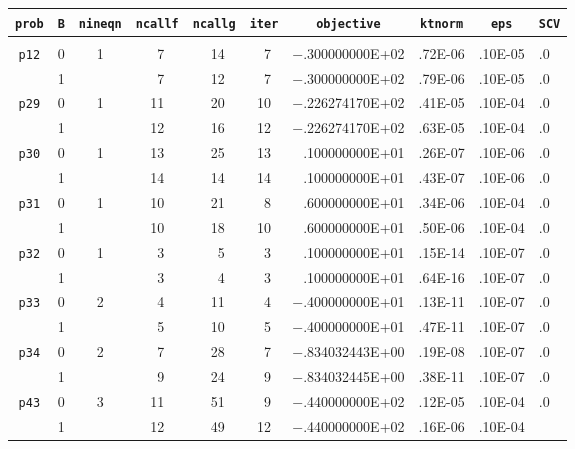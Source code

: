 \newpage
\renewcommand{\baselinestretch}{0.95} %
 \footnotesize{
\begin{tabular}{ccccccrlll} \hline
\multicolumn{1}{c}{{\tt prob}} & 
\multicolumn{1}{c}{{\tt B}} & 
\multicolumn{1}{c}{{\tt nineqn}} & 
\multicolumn{1}{c}{{\tt ncallf}} & 
\multicolumn{1}{c}{{\tt ncallg}} & 
\multicolumn{1}{c}{{\tt iter}} &
\multicolumn{1}{c}{{\tt objective}} & 
\multicolumn{1}{c}{{\tt ktnorm}} & 
\multicolumn{1}{c}{{\tt eps}} & 
\multicolumn{1}{l}{{\tt SCV}} \\ \hline \\

 {\tt p12} & 0 & 1  & ~7   &  ~14  &~7  &$-$.300000000E+02 &.72E-06 & .10E-05 &
.0\\
           & 1 &    & ~7   &  ~12  &~7  &$-$.300000000E+02 &.79E-06 & .10E-05 &
.0\\\hline
 {\tt p29} & 0 & 1  &  11  &  ~20  & 10 &$-$.226274170E+02 &.41E-05 & .10E-04 &
.0\\
           & 1 &    &  12  &  ~16  & 12 &$-$.226274170E+02 &.63E-05 & .10E-04 &
.0\\\hline
 {\tt p30} & 0 & 1  &  13  &  ~25  & 13 &   .100000000E+01 &.26E-07 & .10E-06 &
.0\\
           & 1 &    &  14  &  ~14  & 14 &   .100000000E+01 &.43E-07 & .10E-06 &
.0\\\hline
 {\tt p31} & 0 & 1  &  10  &  ~21  &~8  &   .600000000E+01 &.34E-06 & .10E-04 &
.0\\
           & 1 &    &  10  &  ~18  & 10 &   .600000000E+01 &.50E-06 & .10E-04 &
.0\\\hline
 {\tt p32} & 0 & 1  & ~3   & ~~5   &~3  &   .100000000E+01 &.15E-14 & .10E-07 &
.0\\
           & 1 &    & ~3   & ~~4   &~3  &   .100000000E+01 &.64E-16 & .10E-07 &
.0\\\hline
 {\tt p33} & 0 & 2  & ~4   &  ~11  &~4  &$-$.400000000E+01 &.13E-11 & .10E-07 &
.0\\
           & 1 &    & ~5   &  ~10  &~5  &$-$.400000000E+01 &.47E-11 & .10E-07 &
.0\\\hline
 {\tt p34} & 0 & 2  & ~7   &  ~28  &~7  &$-$.834032443E+00 &.19E-08 & .10E-07 &
.0\\
           & 1 &    & ~9   &  ~24  &~9  &$-$.834032445E+00 &.38E-11 & .10E-07 &
.0\\\hline
 {\tt p43} & 0 & 3  &  11  &  ~51  & ~9 &$-$.440000000E+02 &.12E-05 & .10E-04 &
.0\\
           & 1 &    &  12  &  ~49  &12  &$-$.440000000E+02 &.16E-06 & .10E-04 &

\end{tabular}}

